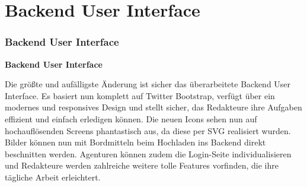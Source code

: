 %

\section{Backend User Interface}
\begin{frame}[fragile]
	\frametitle{Backend User Interface}

	\begin{center}\huge{\color{typo3darkgrey}\textbf{Backend User Interface}}\end{center}

	Die größte und aufälligste Änderung ist sicher das überarbeitete Backend User
	Interface. Es basiert nun komplett auf Twitter Bootstrap, verfügt über ein modernes
	und responsives Design und stellt sicher, das Redakteure ihre Aufgaben effizient und
	einfach erledigen können.\newline
	Die neuen Icons sehen nun auf hochauflösenden Screens phantastisch aus, da diese per
	SVG realisiert wurden. Bilder können nun mit Bordmitteln beim Hochladen ins Backend
	direkt beschnitten werden.\newline
	Agenturen können zudem die Login-Seite individualisieren und Redakteure werden
	zahlreiche weitere tolle Features vorfinden, die ihre tägliche Arbeit erleichtert.

\end{frame}

